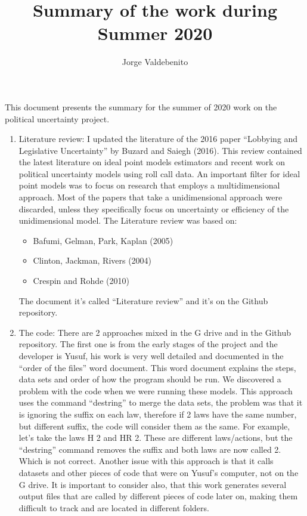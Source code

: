 \documentclass[a4paper,12pt]{article}
\begin{document}
\title{\vspace{-1.5 cm}Summary of the work during Summer 2020}
\author{Jorge Valdebenito}
\maketitle

This document presents the summary for the summer of 2020 work on the political uncertainty project. 
\begin{enumerate}
\item Literature review:
I updated the literature of the 2016 paper “Lobbying and Legislative Uncertainty” by Buzard and Saiegh (2016). This review contained the latest literature on ideal point models estimators and recent work on political uncertainty models using roll call data. An important filter for ideal point models was to focus on research that employs a multidimensional approach. Most of the papers that take a unidimensional approach were discarded, unless they specifically focus on uncertainty or efficiency of the unidimensional model.
The Literature review was based on:

\begin{itemize}
\item Bafumi, Gelman, Park, Kaplan (2005) 
\item Clinton, Jackman, Rivers (2004)
\item Crespin and Rohde (2010)
\end{itemize}
The document it’s called “Literature review” and it’s on the Github repository.



\item The code:
There are 2 approaches mixed in the G drive and in the Github repository. The first one is from the early stages of the project and the developer is Yusuf, his work is very well detailed and documented in the “order of the files” word document. This word document explains the steps, data sets and order of how the program should be run. We discovered a problem with the code when we were running these models. This approach uses the command “destring” to merge the data sets, the problem was that it is ignoring the suffix on each law, therefore if 2 laws have the same number, but different suffix, the code will consider them as the same. 
For example, let’s take the laws H 2 and HR 2. These are different laws/actions, but the “destring” command removes the suffix and both laws are now called 2. Which is not correct. 
Another issue with this approach is that it calls datasets and other pieces of code that were on Yusuf’s computer, not on the G drive. It is important to consider also, that this work generates several output files that are called by different pieces of code later on, making them difficult to track and are located in different folders. 


\end{enumerate}
\end{document}
